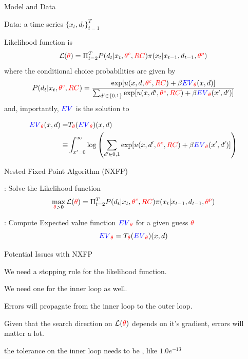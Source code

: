 \documentclass[english]{beamer}
\begin{document}
\begin{frame}{Model and Data}
\begin{midi}
\item Data: a time series $\{x_t,d_t \}_{t=1}^T$
\item Likelihood function is
\begin{equation*}
\mathcal{L}({\color{red}{\theta}}) = \Pi_{t=2}^T P(d_t|x_t,{\color{red}{\theta^c}},{\color{red}{RC}})\pi(x_t|x_{t-1},d_{t-1},{\color{red}{\theta^p}})
\end{equation*}
where the conditional choice probabilities are given by
\begin{equation*}
P(d_t|x_t,{\color{red}{\theta^c}},{\color{red}{RC}}) = \frac{\exp[u(x,d,{\color{red}{\theta^c}},{\color{red}{RC}}) + \beta{\color{blue}{EV}}_{\color{red}{\theta}}(x,d)]}{\sum_{d'\in\{0,1\}}\exp[u(x,d',{\color{red}{\theta^c}},{\color{red}{RC}}) + \beta{\color{blue}{EV}}_{\color{red}{\theta}}(x',d')]}
\end{equation*}
and, importantly, ${\color{blue}{EV}}$ is the solution to

\begin{align*}
{\color{blue}{EV}}_{\color{red}{\theta}}(x,d) =& T_{\color{red}{\theta}}({\color{blue}{EV}}_{\color{red}{\theta}})(x,d) \\
                       \equiv&\int_{x'=0}^\infty \log \left( \sum_{d'\in{0,1}}\exp[u(x,d',{\color{red}{\theta^c}},{\color{red}{RC}}) + \beta{\color{blue}{EV}}_{\color{red}{\theta}}(x',d')] \right)
\end{align*}
\end{midi}
\end{frame}


\begin{frame}{Nested Fixed Point Algorithm (NXFP)}
\begin{widee}
\item {}: Solve the Likelihood function
\begin{equation*}
\max_{{\color{red}{\theta}}>0} \mathcal{L}({\color{red}{\theta}}) = \Pi_{t=2}^T P(d_t|x_t,{\color{red}{\theta^c}},{\color{red}{RC}})\pi(x_t|x_{t-1},d_{t-1},{\color{red}{\theta^p}})
\end{equation*}
\item {}: Compute Expected value function ${\color{blue}{EV}}_{\color{red}{\theta}}$ for a given guess ${\color{red}{\theta}}$
\begin{equation*}
{\color{blue}{EV}}_{\color{red}{\theta}} = T_{\color{red}{\theta}}({\color{blue}{EV}}_{\color{red}{\theta}})(x,d)
\end{equation*}
\end{widee}
\end{frame}

\begin{frame}{Potential Issues with NXFP}
\begin{midi}
\item We need a stopping rule for the likelihood function.
\item We need one for the inner loop as well.
\item Errors will propagate from the inner loop to the outer loop.
\item Given that the search direction on $\mathcal{L}({\color{red}{\theta}})$ depends on it's gradient, errors will matter a lot.
\item the tolerance on the inner loop needs to be , like $1.0e^{-13}$
\end{midi}
\end{frame}
\end{document}
